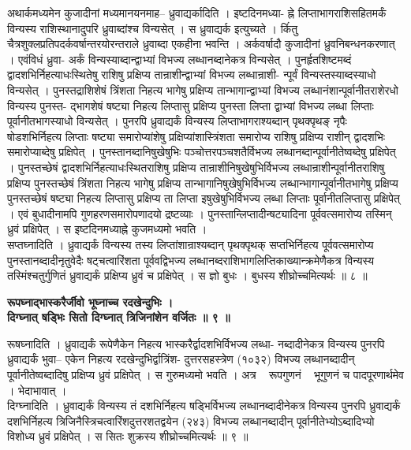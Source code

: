 \documentclass[11pt, openany]{book}
\begin{document}
{{{{\vspace{2mm}
\justifying
 अथार्कमध्यमेन कुजादीनां मध्यमानयनमाह-- ध्रुवाद्यर्कादिति ।
इष्टदिनमध्या-
ह्ने लिप्ताभागराशिसहितमर्कं विन्यस्य राशिस्थानादुपरि ध्रुवाब्दांश्च
विन्यसेत् ।
स ध्रुवाद्यर्क इत्युच्यते । किंंतु
चैत्रशुक्लप्रतिपदर्कवर्षान्तरयोरन्तराले ध्रुवाब्दा
एकहीना भवन्ति । अर्कवर्षादौ कुजादीनां ध्रुवनिबन्धनकरणात् । एवंविधं
ध्रुवा-
अर्कं विन्यस्याब्दान्द्वाभ्यां विभज्य लब्धानब्दानेकत्र विन्यसेत् ।
पुनर्हृतशिष्टमब्दं
द्वादशभिर्निहत्याधःस्थितेषु राशिषु प्रक्षिप्य तान्राशीन्द्वाभ्यां
विभज्य लब्धान्राशी-
न्पूर्वं विन्यस्तस्याब्दस्याधो विन्यसेत् । पुनस्तद्राशिशेषं त्रिंशता
निहत्य भागेषु
प्रक्षिप्य तान्भागान्द्वाभ्यां विभज्य लब्धानंशान्पूर्वानीतराशेरधो
विन्यस्य पुनस्त-
द्भागशेषं षष्ट्या निहत्य लिप्तासु प्रक्षिप्य पुनस्ता लिप्ता द्वाभ्यां
विभज्य
लब्धा लिप्ताः पूर्वानीतभागस्याधो विन्यसेत् । पुनरपि ध्रुवाद्यर्कं
विन्यस्य लिप्ताभागराश्यब्दान् पृथक्पृथङ् नृपैः षोडशभिर्निहत्य लिप्ताः षष्ट्या
समारोप्यांशेषु प्रक्षिप्यांशास्त्रिंशता समारोप्य राशिषु प्रक्षिप्य राशीन्
द्वादशभिः समारोप्याब्देषु प्रक्षिपेत् । पुनस्तानब्दानिषुखेषुभिः
पञ्चोत्तरपञ्चशतैर्विभज्य लब्धानब्दान्पूर्वानीतेष्वब्देषु प्रक्षिपेत् । पुनस्तच्छेषं
द्वादशभिर्निहत्याधःस्थितराशिषु प्रक्षिप्य तान्राशीनिषुखेषुभिर्विभज्य लब्धान्राशीन्पूर्वानीतराशिषु
प्रक्षिप्य पुनस्तच्छेषं त्रिंशता निहत्य भागेषु प्रक्षिप्य तान्भागानिषुखेषुभिर्विभज्य
लब्धान्भागान्पूर्वानीतभागेषु प्रक्षिप्य पुनस्तच्छेषं षष्ट्या निहत्य लिप्तासु
प्रक्षिप्य ता लिप्ता
इषुखेषुभिर्विभज्य लब्धा लिप्ताः पूर्वानीतलिप्तासु प्रक्षिपेत् । एवं
बुधादीनामपि
गुणहरणसमारोपणादयो द्रष्टव्याः । पुनस्तान्लिप्तादीन्षट्यादिना
पूर्ववत्समारोप्य 
तस्मिन् ध्रुवं प्रक्षिपेत् । स इष्टदिनमध्याह्ने कुजमध्यमो भवति ।\\
\indent
 सप्तघ्नादिति । ध्रुवाद्यर्कं विन्यस्य तस्य लिप्तांशान्राश्यब्दान्
पृथक्पृथक्
सप्तभिर्निहत्य पूर्ववत्समारोप्य पुनस्तानब्दादीनृतुवेदैः षट्चत्वारिंशता
पूर्ववद्विभज्य
लब्धानब्दराशिभागलिप्तिकाख्यान्क्रमेणैकत्र विन्यस्य तस्मिंश्चतुर्गुणितं
ध्रुवाद्यर्कं
प्रक्षिप्य ध्रुवं च प्रक्षिपेत् । स ज्ञो बुधः । बुधस्य
शीघ्रोच्चमित्यर्थः ॥ ८ ॥
 

\newpage
\centering
\textbf{
 रूपघ्नाद्भास्करैर्जीवो भूघ्नाच्च रदखेन्दुभिः ।\\
 \hspace{2cm}
 दिग्घ्नात् षड्भिः सितो दिग्घ्नात् त्रिजिनांशेन वर्जितः ॥ ९ ॥}
 
\vspace{2mm}
\justifying
 रूषघ्नादिति । ध्रुवाद्यर्कं रूपेणैकेन निहत्य
भास्करैर्द्वादशभिर्विभज्य लब्धा-
नब्दादीनेकत्र विन्यस्य पुनरपि ध्रुवाद्यर्कं भुवा-- एकेन निहत्य
रदखेन्दुभिर्द्वात्रिंश-
दुत्तरसहस्त्रेण (१०३२) विभज्य लब्धानब्दादीन् पूर्वानीतेष्वब्दादिषु
प्रक्षिप्य
ध्रुवं प्रक्षिपेत् । स गुरुमध्यमो भवति । अत्र   रूपगुणनं    भूगुणनं   च
पादपूरणार्थमेव । भेदाभावात् ।\\
\indent
 दिग्घ्नादिति । ध्रुवाद्यर्कं विन्यस्य तं दशभिर्निहत्य षड्भिर्विभज्य
लब्धानब्दादीनेकत्र विन्यस्य पुनरपि ध्रुवाद्यर्कं दशभिर्निहत्य
त्रिजिनैस्त्रिचत्वारिंशदुत्तरशतद्वयेन (२४३) विभज्य लब्धानब्दादीन् पूर्वानीतेभ्योऽब्दादिभ्यो
विशोध्य
ध्रुवं प्रक्षिपेत् । स सितः शुक्रस्य शीघ्रोच्चमित्यर्थः ॥ ९ ॥

}}}}
\end{document}
